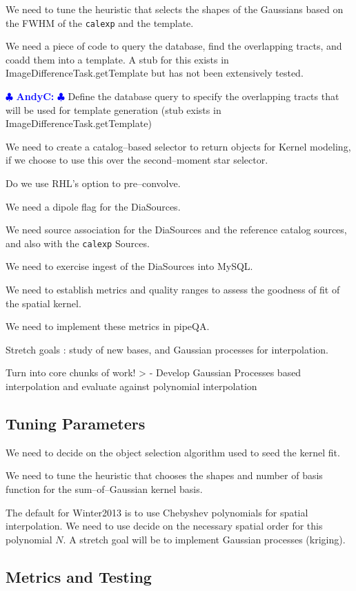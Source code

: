\documentclass[12pt]{article}
\newcommand{\ajc} { \textcolor{blue} {
\ensuremath{\clubsuit} {\bf AndyC:}  
\ensuremath{\clubsuit} } }
\begin{document}
We need to tune the heuristic that selects the shapes of the Gaussians
based on the FWHM of the {\tt calexp} and the template.

We need a piece of code to query the database, find the overlapping
tracts, and coadd them into a template.  A stub for this exists in
ImageDifferenceTask.getTemplate but has not been extensively tested.

\ajc Define the database query to specify the overlapping tracts that
will be used for template generation (stub exists in
ImageDifferenceTask.getTemplate)

We need to create a catalog--based selector to return objects for
Kernel modeling, if we choose to use this over the second--moment star
selector.

Do we use RHL's option to pre--convolve.

We need a dipole flag for the DiaSources.

We need source association for the DiaSources and the reference
catalog sources, and also with the {\tt calexp} Sources.

We need to exercise ingest of the DiaSources into MySQL.

We need to establish metrics and quality ranges to assess the goodness
of fit of the spatial kernel.

We need to implement these metrics in pipeQA.

Stretch goals : study of new bases, and Gaussian processes for
interpolation.

Turn into core chunks of work!
> - Develop Gaussian Processes based interpolation and evaluate against polynomial interpolation

\subsection{Tuning Parameters}
We need to decide on the object selection algorithm used to seed the
kernel fit.

We need to tune the heuristic that chooses the shapes and number of
basis function for the sum--of--Gaussian kernel basis.

The default for Winter2013 is to use Chebyshev polynomials for spatial
interpolation.  We need to use decide on the necessary spatial order
for this polynomial $N$.  A stretch goal will be to implement Gaussian
processes (kriging).

\subsection{Metrics and Testing}
\end{document}
